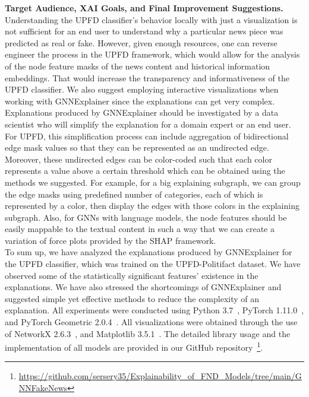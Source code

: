 \textbf{Target Audience, XAI Goals, and Final Improvement Suggestions.} Understanding the UPFD classifier's behavior locally with just a visualization is not sufficient for an end user to understand why a particular news piece was predicted as real or fake. However, given enough resources, one can reverse engineer the process in the UPFD framework, which would allow for the analysis of the node feature masks of the news content and historical information embeddings. That would increase the transparency and informativeness of the UPFD classifier. We also suggest employing interactive visualizations when working with GNNExplainer since the explanations can get very complex. Explanations produced by GNNExplainer should be investigated by a data scientist who will simplify the explanation for a domain expert or an end user. For UPFD, this simplification process can include aggregation of bidirectional edge mask values so that they can be represented as an undirected edge. Moreover, these undirected edges can be color-coded such that each color represents a value above a certain threshold which can be obtained using the methods we suggested. For example, for a big explaining subgraph, we can group the edge masks using predefined number of categories, each of which is represented by a color, then display the edges with those colors in the explaining subgraph. Also, for GNNs with language models, the node features should be easily mappable to the textual content in such a way that we can create a variation of force plots provided by the SHAP framework.\\
To sum up, we have analyzed the explanations produced by GNNExplainer for the UPFD classifier, which was trained on the UPFD-Politifact dataset. We have observed some of the statistically significant features' existence in the explanations. We have also stressed the shortcomings of GNNExplainer and suggested simple yet effective methods to reduce the complexity of an explanation. All experiments were conducted using Python 3.7~\parencite{Python_Rossum}, PyTorch 1.11.0~\parencite{PyTorch_Paszke}, and PyTorch Geometric 2.0.4~\parencite{PyTorchGeometric_Fey}. All visualizations were obtained through the use of NetworkX 2.6.3~\parencite{NetworkX_Hagberg}, and Matplotlib 3.5.1~\parencite{Matplotlib_Hunter}. The detailed library usage and the implementation of all models are provided in our GitHub repository~\footnote{\url{https://github.com/sersery35/Explainability_of_FND_Models/tree/main/GNNFakeNews}}.
